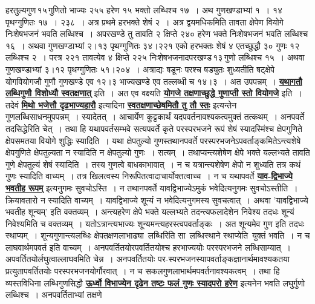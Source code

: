 \documentclass[11pt, openany]{book}
\begin{document}
{{\noindent हरतुल्यगुण\textendash \,१५\textendash \,गुणितो भाज्यः २५५ हरेण १५ भक्तो लब्धिश्च १७~। अथ 
गुणखण्डाभ्यां १~। १४ पृथग्गुणितः १७~। २३८~। अत्र प्रथमे हरभक्ते शेषं 
२~। अत्र द्वयमधिकमिति तावता क्षेपेण वियोगे निःशेषभजनं भवति लब्धिश्च~। 
अपरखण्डे तु तावति २ क्षिप्ते २४० हरेण भक्ते निःशेषभजनं भवति 
लब्धिश्च १६~। अथवा गुणखण्डाभ्यां २।१३ पृथग्गुणितः ३४।२२१ एको हरभक्तः 
शेषं ४ एतच्छुद्धौ ३० गुणः १२ लब्धिश्च २~। परत्र २२१ तावत्येव ४ 
क्षिप्ते २२५ निःशेषभजनादपरखण्ड\textendash \,१३\textendash \,गुणो लब्धिश्च १५~। अथवा 
गुणखण्डाभ्यां ३।१२ पृथग्गुणितः ५१।२०४~। अत्राद्यः षडूनः परश्च षड्युतः 
शुध्यतीति षट्क्षेपे योगवियोगजौ गुणौ गुणखण्डे एव १२।३ भाज्यखण्डे एव
तल्लब्धी च १४।३~। अत उपपन्नम्~। \hyperref[52]{\textbf{यथागतौ लब्धिगुणौ विशोध्यौ 
स्वतक्षणात्}} इति~। अत एव वक्ष्यति \hyperref[54]{\textbf{योगजे तक्षणाच्छुद्धे गुणाप्ती स्तो
वियोगजे}} इति~। तदेवं \hyperref[51]{\textbf{मिथो भजेत्तौ दृढभाज्यहारौ}} इत्यादिना \hyperref[52]{\textbf{स्वतक्षणाच्छेषमितौ तु तौ स्तः}} इत्यन्तेन गुणलब्धिसाधनमुपपन्नम्~।
स्यादेतत्~। आचार्येण कुट्टकार्थं यदपवर्तनावश्यकत्वमुक्तं तत्कथम्~। अनपवर्ते
तदसिद्धेरिति चेत्~। तथा हि यथापवर्तसम्भवे सत्यपवर्ते कृते परस्परभजने रूपं शेषं 
स्यादस्मिंश्च क्षेपगुणिते क्षेपसमतया वियोगे शुद्धिः स्यादिति~। यथा
क्षेपतुल्यो गुणस्तथानपवर्ते परस्परभजनेऽपवर्ताङ्कमितेऽन्त्यशेषे क्षेपगुणिते
क्षेपतुल्यता न स्यादिति न क्षेपतुल्यो गुणः~। सत्यम्~। तथाप्यन्त्यशेषेण क्षेपे भक्ते 
यल्लभ्यते तावति गुणे क्षेपतुल्यं शेषं स्यादिति~। तस्य गुणत्वे
बाधकाभावात्~। 
न च यत्रान्त्यशेषेण क्षेपो न शुध्यति तत्र कथं गुणः स्यादिति वाच्यम्~। 
तत्र खिलत्वस्य निरूपितत्वादाचार्योक्तत्वाच्च~। न च यथापवर्ते
\hyperref[51]{\textbf{याव-द्विभाज्ये भवतीह रूपम्}} इत्यनुगमः सुवचोऽस्ति~। न तथानपवर्ते 
यावद्विभाज्येऽमुकं भवेदित्यनुगमः सुवचोऽस्तीति~। क्रियावतारो न स्यादिति वाच्यम्~।
यावद्विभाज्ये शून्यं न भवेदित्यनुगमस्य सुवचत्वात्~। अथवा 'यावद्विभाज्ये भवतीह शून्यम्' इति वक्तव्यम्~। अन्त्यहरेण क्षेपे भक्ते यल्लभ्यते
तदन्त्यफलादेशेन निवेश्य तदधः शून्यं निवेश्यमिति च वक्तव्यम्~। यतोऽत्रान्त्यभाज्यः
शून्यमन्त्यहरस्त्वपवर्ताङ्कः~। अत शून्यमेव गुण इति तदधः स्थाप्यम्~।
\newpage
\noindent शून्यगुणान्त्यलब्धिः \;क्षेपतक्षणलाभाढ्या \,लब्धिरिति \;सा \,लब्धिस्थाने \;स्थाप्येति \,युक्तं भवति~। न च लाघवार्थमपवर्त इति वाच्यम्~। 
अनपवर्तितयोरपवर्तितयोश्च हरभाज्ययोः परस्परभजने लब्धिसाम्यात्~।
अपवर्तितयोर्लघुत्वाल्लाघवमिति चेन्न~। 
अनपवर्तितयोः पर-स्परभजनस्यापवर्ताङ्कज्ञानार्थमावश्यकतया
प्रत्युतापवर्तितयोः परस्परभजनयोर्गौरवात्~। 
न च सकलगुणलाभार्थमपवर्तनावश्यकत्वम्~। तथा हि\textendash \,व्यस्तविधिना लब्धिगुणसिद्धौ \hyperref[51]{\textbf{ऊर्ध्वो विभाज्येन दृढेन तष्टः फलं गुणः
स्यादपरो हरेण}} इत्यनेन भवति लघुर्गुणो लब्धिश्च~। अनपवर्तिताभ्यां तक्षणे
}}
\end{document}
